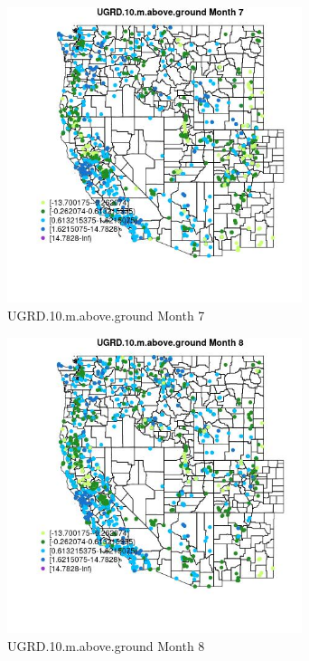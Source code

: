 \begin{figure} 
\centering  
\includegraphics[width=0.77\textwidth]{Code_Outputs/Report_ML_input_PM25_Step4_part_f_de_duplicated_aves_prioritize_24hr_obswNAs_MapObsMo7UGRD10maboveground.jpg} 
\caption{\label{fig:Report_ML_input_PM25_Step4_part_f_de_duplicated_aves_prioritize_24hr_obswNAsMapObsMo7UGRD10maboveground}UGRD.10.m.above.ground Month 7} 
\end{figure} 
 

\begin{figure} 
\centering  
\includegraphics[width=0.77\textwidth]{Code_Outputs/Report_ML_input_PM25_Step4_part_f_de_duplicated_aves_prioritize_24hr_obswNAs_MapObsMo8UGRD10maboveground.jpg} 
\caption{\label{fig:Report_ML_input_PM25_Step4_part_f_de_duplicated_aves_prioritize_24hr_obswNAsMapObsMo8UGRD10maboveground}UGRD.10.m.above.ground Month 8} 
\end{figure} 
 

